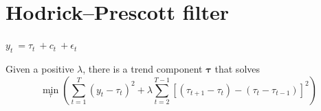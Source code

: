 \begin{slide}
  \begin{center}
  \end{center}
\end{slide}


\section[HP Filter]{Hodrick–Prescott filter}
\begin{slide}

  \begin{center}
    \large
    \begin{math}
      y_t\ = \tau_t\ + c_t\ + \epsilon_t
    \end{math}
  \end{center}
  Given a positive $\lambda$, there is a trend component $\mathbf{\tau}$ that solves
  \begin{displaymath}
    \min_{\tau}\left(\sum_{t = 1}^T {(y_t - \tau _t )^2 }  + \lambda \sum_{t = 2}^{T - 1} {[(\tau _{t+1}  - \tau _t) - (\tau _t  - \tau _{t - 1} )]^2 }\right)
  \end{displaymath}  
\end{slide}

\begin{slide}
  \begin{center}
  \end{center}
\end{slide}


